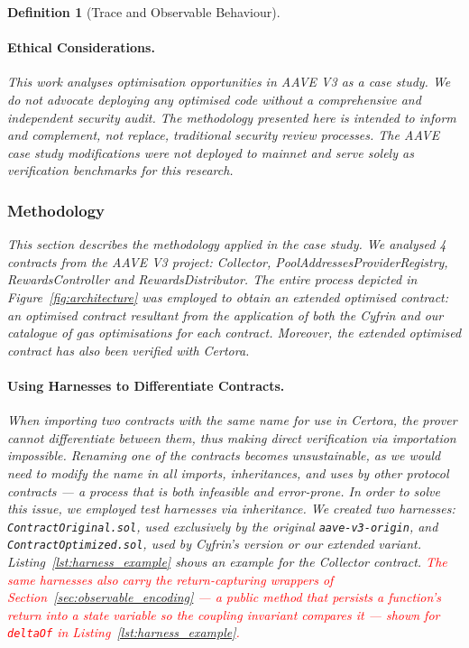 \documentclass[manuscript,screen,review]{acmart}
\newcommand{\revised}[1]{\textcolor{red}{#1}}
\newtheorem{definition}{Definition}
\begin{document}
\begin{definition}[Trace and Observable Behaviour]
\paragraph{Ethical Considerations.} This work analyses optimisation opportunities in AAVE V3 as a case study. We do not advocate deploying any optimised code without a comprehensive and independent security audit. The methodology presented here is intended to inform and complement, not replace, traditional security review processes. The AAVE case study modifications were not deployed to mainnet and serve solely as verification benchmarks for this research.

\subsubsection{Methodology}
\label{sec:methodology}

This section describes the methodology applied in the case study. We analysed 4 contracts from the AAVE V3 project: Collector, PoolAddressesProviderRegistry, RewardsController and RewardsDistributor. The entire process depicted in Figure~\ref{fig:architecture} was employed to obtain an {\em extended optimised contract\/}: an optimised contract resultant from the application of both the Cyfrin and our catalogue of gas optimisations for each contract. Moreover, the extended optimised contract has also been verified with Certora.

\paragraph{Using Harnesses to Differentiate Contracts.}

When importing two contracts with the same name for use in Certora, the prover cannot differentiate between them, thus making direct verification via importation impossible. Renaming one of the contracts becomes unsustainable, as we would need to modify the name in all imports, inheritances, and uses by other protocol contracts --- a process that is both infeasible and error-prone. In order to solve this issue, we employed \emph{test harnesses} via inheritance. We created two harnesses: \texttt{ContractOriginal.sol}, used exclusively by the original \texttt{aave-v3-origin}, and \texttt{ContractOptimized.sol}, used by Cyfrin's version or our extended variant. Listing~\ref{lst:harness_example} shows an example for the Collector contract. \revised{The same harnesses also carry the return-capturing wrappers of Section~\ref{sec:observable_encoding} --- a public method that persists a function's return into a state variable so the coupling invariant compares it --- shown for \texttt{deltaOf} in Listing~\ref{lst:harness_example}.}


\end{definition}
\end{document}
